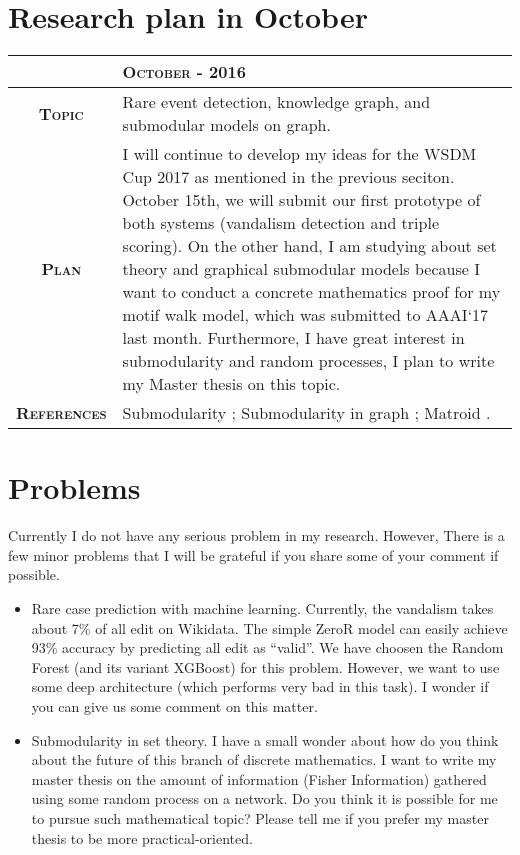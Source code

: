 \documentclass[12pt,twoside]{article}
\begin{document}
\section{Research plan in October}

\begin{center}
  \renewcommand{\arraystretch}{1.5}
  \begin{longtable}{| c | p{12cm} |}
  \hline
  & \textbf{\textsc{October - 2016}} \\ \hline
  \textbf{\textsc{Topic}} & Rare event detection, knowledge graph,
  and submodular models on graph.\\ \hline
  \textbf{\textsc{Plan}} & I will continue to develop my ideas for
  the WSDM Cup 2017 as mentioned in the previous seciton. October 15th,
  we will submit our first prototype of both systems (vandalism detection
  and triple scoring). On the other hand, I am studying about set theory
  and graphical submodular models because I want to conduct a concrete 
  mathematics proof for my motif walk model, which was submitted to
  AAAI`17 last month. Furthermore, I have great interest in submodularity
  and random processes, I plan to write my Master thesis on this topic.
  \\ \hline
  \textbf{\textsc{References}} & Submodularity \cite{submodularity}; 
  Submodularity in graph \cite{sgraph}; Matroid \cite{matroid}.
  \\ \hline
  \end{longtable}
\end{center}

\section{Problems}

\noindent
Currently I do not have any serious problem in my research. However,
There is a few minor problems that I will be grateful if you share
some of your comment if possible. 

\begin{itemize}
  \item Rare case prediction with machine learning. Currently, the
  vandalism takes about 7\% of all edit on Wikidata. The simple ZeroR
  model can easily achieve 93\% accuracy by predicting all edit as
  ``valid''. We have choosen the Random Forest (and its variant XGBoost)
  for this problem. However, we want to use some deep architecture
  (which performs very bad in this task). I wonder if you can give
  us some comment on this matter.
  \item Submodularity in set theory. I have a small wonder about
  how do you think about the future of this branch of discrete 
  mathematics. I want to write my master thesis on the amount of
  information (Fisher Information) gathered using some random
  process on a network. Do you think it is possible for me to
  pursue such mathematical topic? Please tell me if you prefer
  my master thesis to be more practical-oriented.

\end{itemize}
\end{document}
